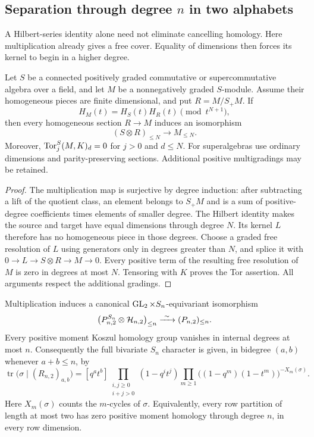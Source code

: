\subsection{Separation through degree \texorpdfstring{$n$}{n} in two alphabets}

A Hilbert-series identity alone need not eliminate cancelling homology.
Here multiplication already gives a free cover. Equality of dimensions
then forces its kernel to begin in a higher degree.

\begin{lemma}
\label{lem:truncated-freeness}
Let $S$ be a connected positively graded commutative or
supercommutative algebra over a field, and let $M$ be a nonnegatively
graded $S$-module. Assume their homogeneous pieces are finite
dimensional, and put $R=M/S_+M$. If
\[
 H_M(t)=H_S(t)H_R(t)\pmod{t^{N+1}},
\]
then every homogeneous section $R\to M$ induces an isomorphism
\[
 (S\otimes R)_{\le N}\longrightarrow M_{\le N}.
\]
Moreover, $\operatorname{Tor}_j^S(M,K)_d=0$ for $j>0$ and $d\le N$.
For superalgebras use ordinary dimensions and parity-preserving
sections. Additional positive multigradings may be retained.
\end{lemma}

\begin{proof}
The multiplication map is surjective by degree induction: after
subtracting a lift of the quotient class, an element belongs to
$S_+M$ and is a sum of positive-degree coefficients times
elements of smaller degree. The Hilbert identity makes the source
and target have equal dimensions through degree $N$. Its kernel
$L$ therefore has no homogeneous piece in those degrees.
Choose a graded free resolution of $L$ using generators only
in degrees greater than $N$, and splice it with
$0\to L\to S\otimes R\to M\to0$. Every positive term of the resulting
free resolution of $M$ is zero in degrees at most $N$.
Tensoring with $K$ proves the Tor assertion. All arguments respect
the additional gradings.
\end{proof}

\begin{theorem}
\label{thm:bivariate-separation}
Multiplication induces a canonical $\operatorname{GL}_2\times S_n$-equivariant
isomorphism
\[
 \bigl(P_{n,2}^{S_n}\otimes\mathcal H_{n,2}\bigr)_{\le n}
          \xrightarrow{\ \sim\ }(P_{n,2})_{\le n}.
\]
Every positive moment Koszul homology group vanishes in internal
degrees at most $n$. Consequently the full bivariate $S_n$ character
is given, in bidegree $(a,b)$ whenever $a+b\le n$, by
\begin{equation}\label{eq:bivariate-character}
 \operatorname{tr}\bigl(\sigma\mid (R_{n,2})_{a,b}\bigr)
 =[q^at^b]\!
   \prod_{\substack{i,j\ge0\\i+j>0}}(1-q^it^j)
   \prod_{m\ge1}\bigl((1-q^m)(1-t^m)\bigr)^{-X_m(\sigma)}.
\end{equation}
Here $X_m(\sigma)$ counts the $m$-cycles of $\sigma$.
Equivalently, every row partition of length at most two has zero
positive moment homology through degree $n$, in every row dimension.
\end{theorem}

